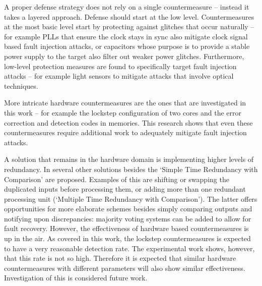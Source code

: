 \documentclass[10pt]{article}
\begin{document}
  A proper defense strategy does not rely on a single countermeasure -- instead it takes a layered approach. Defense should start at the low level. Countermeasures at the most basic level start by protecting against glitches that occur naturally -- for example PLLs that ensure the clock stays in sync also mitigate clock signal based fault injection attacks, or capacitors whose purpose is to provide a stable power supply to the target also filter out weaker power glitches. Furthermore, low-level protection measures are found to specifically target fault injection attacks -- for example light sensors to mitigate attacks that involve optical techniques. 

  More intricate hardware countermeasures are the ones that are investigated in this work -- for example the lockstep configuration of two cores and the error correction and detection codes in memories. This research shows that even these countermeasures require additional work to adequately mitigate fault injection attacks.

  A solution that remains in the hardware domain is implementing higher levels of redundancy. In \citet{bar-el_sorcerers_2006} several other solutions besides the `Simple Time Redundancy with Comparison' are proposed. Examples of this are shifting or swapping the duplicated inputs before processing them, or adding more than one redundant processing unit (`Multiple  Time  Redundancy  with Comparison'). The latter offers opportunities for more elaborate schemes besides simply comparing outputs and notifying upon discrepancies: majority voting systems can be added to allow for fault recovery. 
  However, the effectiveness of hardware based countermeasures is up in the air. As covered in this work, the lockstep countermeasures is expected to have a very reasonable detection rate. The experimental work shows, however, that this rate is not so high. Therefore it is expected that similar hardware countermeasures with different parameters will also show similar effectiveness. Investigation of this is considered future work.
\end{document}
